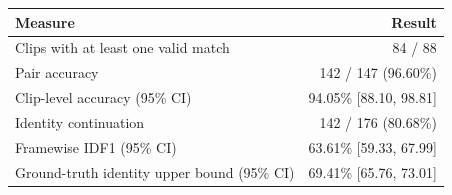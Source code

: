 \begin{tabular}{lr}
\toprule
Measure & Result \\
\midrule
Clips with at least one valid match & 84 / 88 \\
Pair accuracy & 142 / 147 (96.60\%) \\
Clip-level accuracy (95\% CI) & 94.05\% [88.10, 98.81] \\
Identity continuation & 142 / 176 (80.68\%) \\
Framewise IDF1 (95\% CI) & 63.61\% [59.33, 67.99] \\
Ground-truth identity upper bound (95\% CI) & 69.41\% [65.76, 73.01] \\
\bottomrule
\end{tabular}
